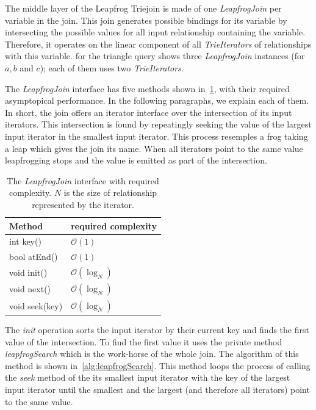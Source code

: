 The middle layer of the Leapfrog Triejoin is made of one \textit{LeapfrogJoin} per variable in the join.
This join generates possible bindings for its variable by intersecting the possible values for all input relationship containing the
variable.
Therefore, it operates on the linear component of all \textit{TrieIterators} of relationships with this variable.
 for the triangle query shows three \textit{LeapfrogJoin} instances (for $a, b$ and $c$);
each of them uses two \textit{TrieIterators}.

The \textit{LeapfrogJoin} interface has five methods shown in~\cref{table:leapfrogJoin-interface}, with their required asymptopical
performance.
In the following paragraphs, we explain each of them.
In short, the join offers an iterator interface over the intersection of its input iterators.
This intersection is found by repeatingly seeking the value of the largest input iterator in the smallest input iterator.
This process resemples a frog taking a leap which gives the join its name.
When all iterators point to the same value leapfrogging stops and the value is emitted as part of the intersection.

\begin{table}
    \centering
    \begin{tabular}{@{}ll@{}}
        \toprule
        Method         &  required complexity    \\
        \midrule
        int key()      &  $\mathcal{O}(1)$       \\
        bool atEnd()   &  $\mathcal{O}(1)$       \\
        void init()    &  $\mathcal{O}(\log_N)$  \\
        void next()    &  $\mathcal{O}(\log_N)$  \\
        void seek(key) &  $\mathcal{O}(\log_N)$  \\
        \bottomrule
    \end{tabular}
    \caption{
    The \textit{LeapfrogJoin} interface with required complexity.
    $N$ is the size of relationship represented by the iterator.
    }
    \label{table:leapfrogJoin-interface}
\end{table}


The \textit{init} operation sorts the input iterator by their current key and finds the first value of the intersection.
To find the first value it uses the private method \textit{leapfrogSearch} which is the work-horse of the whole join.
The algorithm of this method is shown in~\cref{alg:leapfrogSearch}.
This method loops the process of calling the \textit{seek} method of the its smallest input iterator with the key of the largest input
iterator until the smallest and the largest (and therefore all iterators) point to the same value.


